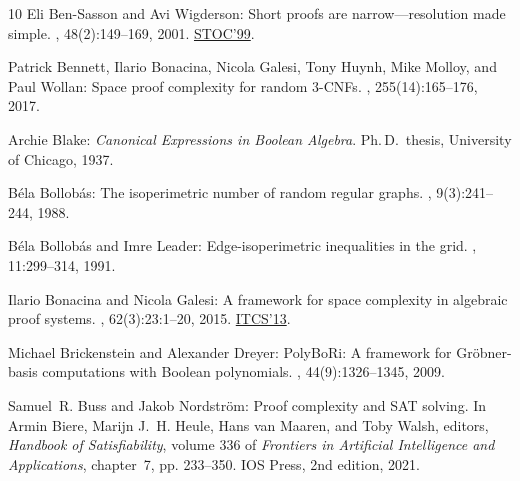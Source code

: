 \begin{thebibliography}{10}
{\sc Eli {Ben-Sasson} and Avi Wigderson}: Short proofs are narrow---resolution
  made simple.
, 48(2):149--169, 2001.
\newblock \prelim \href{https://doi.org/10.1145/301250.301392}{STOC'99}.
\newblock [\epfmtdoi{10.1145/375827.375835}]

{\sc Patrick Bennett, Ilario Bonacina, Nicola Galesi, Tony Huynh, Mike Molloy,
  and Paul Wollan}: Space proof complexity for random $3$-{CNF}s.
, 255(14):165--176, 2017.
\newblock [\epfmtdoi{10.1016/j.ic.2017.06.003}]

{\sc Archie Blake}: {\em Canonical Expressions in {B}oolean Algebra}.
\newblock Ph.\,D.\ thesis, University of Chicago, 1937.

{\sc B{\'e}la Bollob\'{a}s}: The isoperimetric number of random regular graphs.
, 9(3):241--244, 1988.
\newblock [\epfmtdoi{10.1016/S0195-6698(88)80014-3}]

{\sc B\'{e}la Bollob\'{a}s and Imre Leader}: Edge-isoperimetric inequalities in
  the grid.
, 11:299--314, 1991.
\newblock [\epfmtdoi{10.1007/BF01275667}]

{\sc Ilario Bonacina and Nicola Galesi}: A framework for space complexity in
  algebraic proof systems.
, 62(3):23:1--20, 2015.
\newblock \prelim \href{https://doi.org/10.1145/2422436.2422486}{ITCS'13}.
\newblock [\epfmtdoi{10.1145/2699438}]

{\sc Michael Brickenstein and Alexander Dreyer}: {PolyBoRi}: A framework for
  {G}r\"obner-basis computations with {B}oolean polynomials.
, 44(9):1326--1345, 2009.

{\sc Samuel~R. Buss and Jakob Nordstr\"om}: Proof complexity and {SAT} solving.
\newblock In {\sc Armin Biere, Marijn J.~H. Heule, Hans van Maaren, and Toby
  Walsh}, editors, {\em Handbook of Satisfiability}, volume 336 of {\em
  Frontiers in Artificial Intelligence and Applications}, chapter~7, pp.
  233--350. IOS Press, 2nd edition, 2021.


\end{thebibliography}
